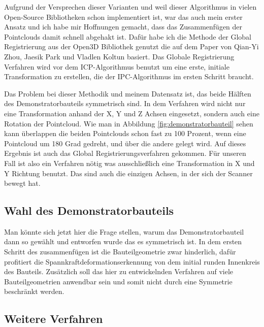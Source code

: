 \documentclass[../main.tex]{subfiles}
\begin{document}
Aufgrund der Versprechen dieser Varianten und weil dieser Algorithmus in vielen
Open-Source Bibliotheken schon implementiert ist, war das auch mein erster Ansatz
und ich habe mir Hoffnungen gemacht, dass das Zusammenfügen der Pointclouds 
damit schnell abgehakt ist. 
Dafür habe ich die Methode der Global Registrierung aus der Open3D Bibliothek genutzt
die auf dem Paper von Qian-Yi Zhou, Jaesik Park und Vladlen Koltun basiert. \cite{Zhou.}
Das Globale Registrierung Verfahren wird vor dem ICP-Algorithmus benutzt um eine erste, 
initiale Transformation zu erstellen, die der IPC-Algorithmus im ersten Schritt braucht.

Das Problem bei dieser Methodik und meinem Datensatz ist, das beide Hälften des
Demonstratorbauteils symmetrisch sind. In dem Verfahren wird nicht nur eine Transformation
anhand der X, Y und Z Achsen eingesetzt, sondern auch eine Rotation der Pointcloud.
Wie man in Abbildung \ref{fig:demonstratorbauteil} sehen kann überlappen die beiden Pointclouds 
schon fast zu 100 Prozent, wenn eine Pointcloud um 180 Grad gedreht, und über die andere
gelegt wird. Auf dieses Ergebnis ist auch das Global Registrierungsverfahren gekommen. 
Für unseren Fall ist also ein Verfahren nötig was ausschließlich eine 
Transformation in X und Y Richtung benutzt. Das sind auch die einzigen Achsen, 
in der sich der Scanner bewegt hat.

\subsection*{Wahl des Demonstratorbauteils}

Man könnte sich jetzt hier die Frage stellen, warum das Demonstratorbauteil dann so gewählt 
und entworfen wurde das es symmetrisch ist. In dem ersten Schritt des zusammenfügen ist 
die Bauteilgeometrie zwar hinderlich, dafür profitiert die 
Spannkraftdeformationserkennung von dem initial runden Innenkreis des Bauteils.
Zusätzlich soll das hier zu entwickelnden Verfahren auf viele Bauteilgeometrien 
anwendbar sein und somit nicht durch eine Symmetrie beschränkt werden.

\subsection*{Weitere Verfahren}
\end{document}
